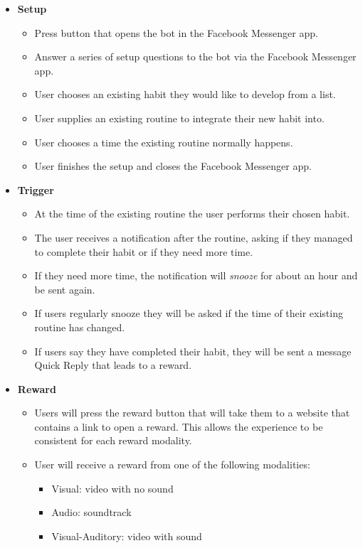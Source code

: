 \begin{itemize}
  \item \textbf{Setup}
  \begin{itemize}
    \item Press button that opens the bot in the Facebook Messenger app.
    \item Answer a series of setup questions to the bot via the Facebook Messenger app.
    \item User chooses an existing habit they would like to develop from a list.
    \item User supplies an existing routine to integrate their new habit into.
    \item User chooses a time the existing routine normally happens.
    \item User finishes the setup and closes the Facebook Messenger app.
  \end{itemize}
  \item \textbf{Trigger}
  \begin{itemize}
    \item At the time of the existing routine the user performs their chosen habit.
    \item The user receives a notification after the routine, asking if they managed to complete their habit or if they need more time.
    \item If they need more time, the notification will \textit{snooze} for about an hour and be sent again.
    \item If users regularly snooze they will be asked if the time of their existing routine has changed.
    \item If users say they have completed their habit, they will be sent a message Quick Reply that leads to a reward.
  \end{itemize}
  \item \textbf{Reward}
  \begin{itemize}
    \item Users will press the reward button that will take them to a website that contains a link to open a reward. This allows the experience to be consistent for each reward modality.
    \item User will receive a reward from one of the following modalities:
    \begin{itemize}
      \item Visual: video with no sound
      \item Audio: soundtrack
      \item Visual-Auditory: video with sound
    \end{itemize}
  \end{itemize}
\end{itemize}

